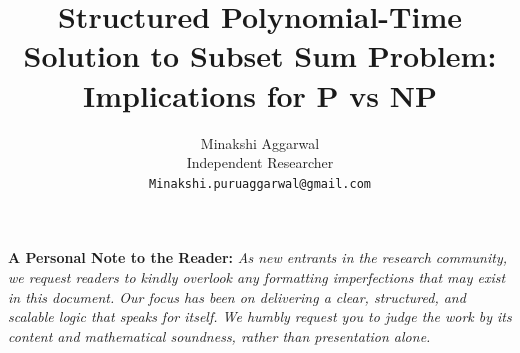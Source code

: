 \documentclass[11pt]{article}
\begin{document}
\title{Structured Polynomial-Time Solution to Subset Sum Problem: \\
Implications for P vs NP} 
\author{Minakshi Aggarwal \\
Independent Researcher \\
\texttt{Minakshi.puruaggarwal@gmail.com}}
\date{}
\maketitle


\vspace{1em}
\noindent
\textbf{A Personal Note to the Reader:} \textit{As new entrants in the research community, we request readers to kindly overlook any formatting imperfections that may exist in this document. Our focus has been on delivering a clear, structured, and scalable logic that speaks for itself. We humbly request you to judge the work by its content and mathematical soundness, rather than presentation alone.}
\vspace{1em}
\end{document}
